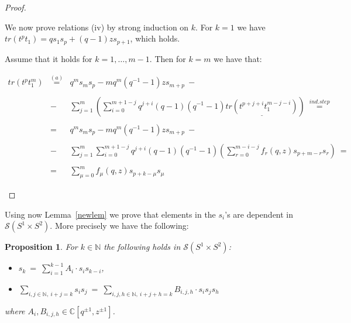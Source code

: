 \documentclass[11pt]{amsart}
\newtheorem{prop}{Proposition}
\begin{document}
\begin{proof}
\begin{itemize}
\noindent We now prove relations (iv) by strong induction on $k$. For $k=1$ we have $tr(t^pt_1)=qs_1s_p+(q-1)zs_{p+1}$, which holds.

\smallbreak

\noindent Assume that it holds for $k=1, \ldots, m-1$. Then for $k=m$ we have that:

\[
\begin{array}{lcl}
tr(t^pt_1^m) & \overset{(a)}{=} & q^ms_ms_p-mq^m(q^{-1}-1)zs_{m+p}\ -\\
&&\\
& - & \sum_{j=1}^{m}{\left(\sum_{i=0}^{m+1-j}{q^{j+i}(q-1)(q^{-1}-1)\underline{tr(t^{p+j+i}t_1^{m-j-i})}}\right)}\ \overset{ind. step}{=}\\
&&\\
& = & q^ms_ms_p-mq^m(q^{-1}-1)zs_{m+p}\ -\\
&&\\
& - & \sum_{j=1}^{m}{\sum_{i=0}^{m+1-j}{q^{j+i}(q-1)(q^{-1}-1)\left(\sum_{r=0}^{m-i-j}{f_r(q,z)s_{p+m-r}s_{r}} \right)}}\ =\\
&&\\
& = & \sum_{\mu=0}^{m}{f_{\mu}(q,z)s_{p+k-\mu}s_{\mu}}
\end{array}
\]

\end{itemize}
\end{proof}

Using now Lemma~\ref{newlem} we prove that elements in the $s_i$'s are dependent in $\mathcal{S}(S^1\times S^2)$. More precisely we have the following:


\begin{prop}
For $k\in \mathbb{N}$ the following holds in $\mathcal{S}(S^1 \times S^2)$:
\begin{itemize}
\item[i.] $s_k\ =\ \sum_{i=1}^{k-1} A_i\cdot s_{i}s_{k-i}$,
\smallbreak
\item[ii.] $\sum_{i, j\in \mathbb{N},\ i+j=k} s_is_j\ =\ \sum_{i, j, h\in \mathbb{N},\ i+j+h=k} B_{i,j,h}\cdot s_is_js_h$
\end{itemize}


\noindent where $A_i, B_{i,j,h} \in \mathbb{C}[q^{\pm 1}, z^{\pm 1}]$.
\end{prop}
\end{document}

